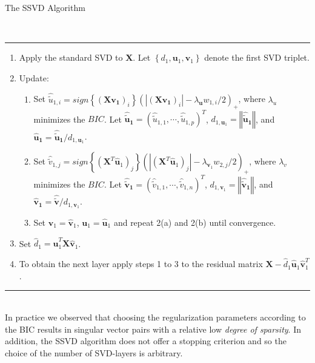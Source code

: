 \documentclass{bioinfo}
\begin{document}
\begin{methods}
\begin{bf}The SSVD Algorithm\end{bf}\\
\hspace{-0.1cm} 
\rule{8.5 cm}{1pt}
\begin{enumerate}
 \item Apply the standard SVD to $\mathbf{X}$. Let $\left\{ d_{1}, \mathbf{u}_{1}, \mathbf{v}_{1} \right\}$ denote the first SVD triplet.
 \item Update:
  \begin{enumerate}
   \item Set $\hat{\tilde{u}}_{1,i}=\textit{sign}\left\{(\mathbf{X}\mathbf{v_{1}})_{i}\right\}(|(\mathbf{X}\mathbf{v_{1}})_{i}|-\lambda_{\mathbf{u}}w_{1,i}/2)_{+}$, 		      where $\lambda_{u}$ minimizes the $\textit{BIC}$. 
         Let $\mathbf{\hat{\tilde{u}}_{1}}=(\hat{\tilde{u}}_{1,1},\cdots,\hat{\tilde{u}}_{1,p})^{T}$,
	 $d_{1,\mathbf{u}_{1}}=\left\Vert \mathbf{\hat{\tilde{u}}_{1}} \right\Vert$, 
	 and $\mathbf{\hat{u}_{1}} = \mathbf{\hat{\tilde{u}}_{1}}/d_{1,\mathbf{u}_{1}}$.
   \item Set $\hat{\tilde{v}}_{1,j}=\textit{sign}\left\{(\mathbf{X}^{T}\mathbf{\hat{u}}_{1})_{j}\right\}(|(\mathbf{X}^{T}\mathbf{\hat{u}}_{1})_{j}|-\lambda_{\mathbf{v}_{1}}w_{2,j}/2)_{+}$, where
	 $\lambda_{v}$ minimizes the $\textit{BIC}$. 
         Let $\mathbf{\hat{\tilde{v}}_{1}}=(\hat{\tilde{v}}_{1,1},\cdots,\hat{\tilde{v}}_{1,n})^{T}$,
	 $d_{1,\mathbf{v}_{1}}=\left\Vert \mathbf{\hat{\tilde{v}}_{1}} \right\Vert$, 
	 and $\mathbf{\hat{v}_{1}} =\mathbf{\hat{\tilde{v}}}/d_{1,\mathbf{v}_{1}}$.
   \item Set $\mathbf{v}_{1}=\mathbf{\hat{v}}_{1}$, $\mathbf{u}_{1}=\mathbf{\hat{u}}_{1}$ and repeat 2(a) and 2(b) until convergence.
  \end{enumerate} 
 \item Set $\hat{d}_{1}=\mathbf{\hat{u}}_{1}^{T}\mathbf{X}\mathbf{\hat{v}}_{1}$.
 \item To obtain the next layer apply steps 1 to 3 to the residual matrix $\mathbf{X}-\hat{d}_{1}\mathbf{\hat{u}}_{1}\mathbf{\hat{v}}_{1}^{T}$.
\end{enumerate}
\hspace{-0.1cm} 
\rule{8.5 cm}{1pt}\\
In practice we observed that choosing the regularization parameters according to the BIC results in singular vector pairs with a relative low \textit{degree of sparsity}. In addition, the SSVD algorithm does not offer a stopping criterion and so the choice of the number of SVD-layers is arbitrary.


\end{methods}
\end{document}
